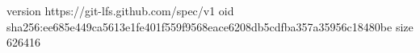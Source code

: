 version https://git-lfs.github.com/spec/v1
oid sha256:ee685e449ca5613e1fe401f559f9568eace6208db5cdfba357a35956c18480be
size 626416
